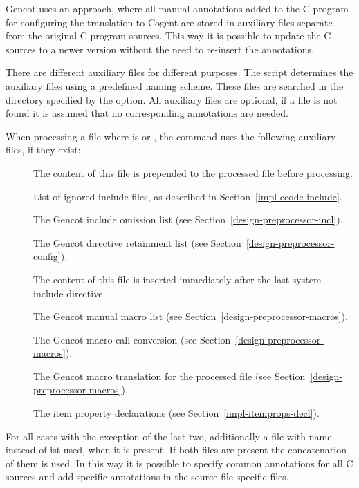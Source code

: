 Gencot uses an approach, where all manual annotations added to the C program for configuring the translation to Cogent 
are stored in auxiliary files separate from the original C program sources. This way it is possible to update the C 
sources to a newer version without the need to re-insert the annotations.

There are different auxiliary files for different purposes. The  script determines the auxiliary files using
a predefined naming scheme. These files are searched in the directory specified by the  option. All auxiliary files
are optional, if a file is not found it is assumed that no corresponding annotations are needed.

When processing a file  where  is  or , the  command uses the 
following auxiliary files, if they exist:
\begin{description}
\item[] The content of this file is prepended to the processed file before processing.
\item[] List of ignored include files, as described in Section~\ref{impl-ccode-include}.
\item[] The Gencot include omission list (see Section~\ref{design-preprocessor-incl}).
\item[] The Gencot directive retainment list (see Section~\ref{design-preprocessor-config}).
\item[] The content of this file is inserted immediately after the last system include directive.
\item[] The Gencot manual macro list (see Section~\ref{design-preprocessor-macros}).
\item[] The Gencot macro call conversion (see Section~\ref{design-preprocessor-macros}).
\item[] The Gencot macro translation for the processed file (see Section~\ref{design-preprocessor-macros}).
\item[] The item property declarations (see Section~\ref{impl-itemprops-decl}).
\end{description}

For all cases with the exception of the last two, additionally a file with name  instead of  ist used, when it
is present. If both files are present the concatenation of them is used. In this way it is possible to specify common annotations 
for all C sources and add specific annotations in the source file specific files.

